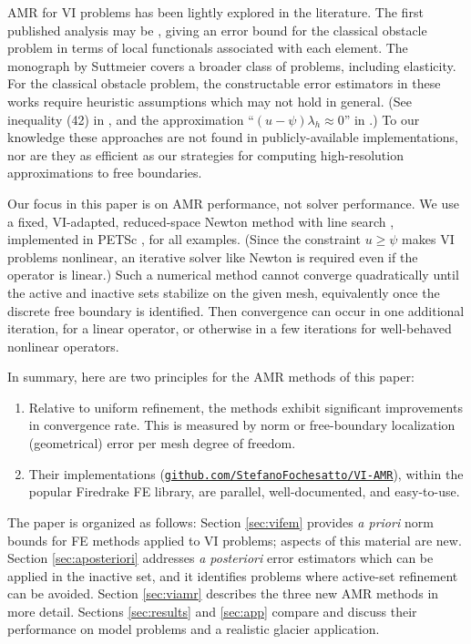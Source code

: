 \documentclass[]{interact}
\theoremstyle{plain}%
\theoremstyle{definition}
\theoremstyle{remark}
\begin{document}
AMR for VI problems has been lightly explored in the literature.  The first published analysis may be \cite{AinsworthOdenLee1993}, giving an error bound for the classical obstacle problem in terms of local functionals associated with each element.  The monograph by Suttmeier \cite{Suttmeier2008} covers a broader class of problems, including elasticity.  For the classical obstacle problem, the constructable error estimators in these works require heuristic assumptions which may not hold in general.  (See inequality (42) in \cite{AinsworthOdenLee1993}, and the approximation ``$(u-\psi)\lambda_h\approx 0$'' in \cite{Suttmeier2008}.)  To our knowledge these approaches are not found in publicly-available implementations, nor are they as efficient as our strategies for computing high-resolution approximations to free boundaries.

Our focus in this paper is on AMR performance, not solver performance.  We use a fixed, VI-adapted, reduced-space Newton method with line search \cite{BensonMunson2006}, implemented in PETSc \cite{petsc-user-ref}, for all examples.  (Since the constraint $u \geq \psi$ makes VI problems nonlinear, an iterative solver like Newton is required even if the operator is linear.)  Such a numerical method cannot converge quadratically until the active and inactive sets stabilize on the given mesh, equivalently once the discrete free boundary is identified.  Then convergence can occur in one additional iteration, for a linear operator, or otherwise in a few iterations for well-behaved nonlinear operators.

In summary, here are two principles for the AMR methods of this paper:
\renewcommand{\labelenumi}{\arabic{enumi}.}
\begin{enumerate}
\item Relative to uniform refinement, the methods exhibit significant improvements in convergence rate.  This is measured by norm or free-boundary localization (geometrical) error per mesh degree of freedom.
\item Their implementations (\href{https://github.com/StefanoFochesatto/VI-AMR}{{\small \texttt{github.com/StefanoFochesatto/VI-AMR}}}), within the popular Firedrake \cite{Langeetal2016} FE library, are parallel, well-documented, and easy-to-use.
\end{enumerate}

The paper is organized as follows:  Section \ref{sec:vifem} provides \emph{a priori} norm bounds for FE methods applied to VI problems; aspects of this material are new.  Section \ref{sec:aposteriori} addresses \emph{a posteriori} error estimators which can be applied in the inactive set, and it identifies problems where active-set refinement can be avoided.  Section \ref{sec:viamr} describes the three new AMR methods in more detail.  Sections \ref{sec:results} and \ref{sec:app} compare and discuss their performance on model problems and a realistic glacier application.
\end{document}

